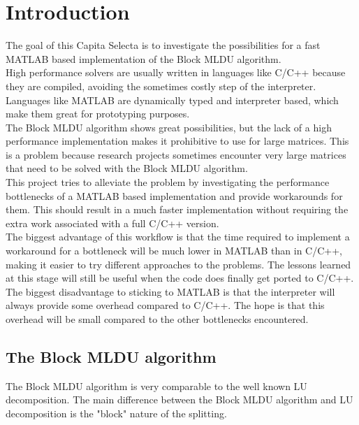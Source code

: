 \chapter{Introduction}

The goal of this Capita Selecta is to investigate the possibilities for a fast MATLAB based implementation of the Block MLDU algorithm.\\

\noindent High performance solvers are usually written in languages like C/C++ because they are compiled, avoiding the sometimes costly step of the interpreter. Languages like MATLAB are dynamically typed and interpreter based, which make them great for prototyping purposes.\\

\noindent The Block MLDU algorithm shows great possibilities, but the lack of a high performance implementation makes it prohibitive to use for large matrices. This is a problem because research projects sometimes encounter very large matrices that need to be solved with the Block MLDU algorithm.\\

\noindent This project tries to alleviate the problem by investigating the performance bottlenecks of a MATLAB based implementation and provide workarounds for them. This should result in a much faster implementation without requiring the extra work associated with a full C/C++ version.\\

\noindent The biggest advantage of this workflow is that the time required to implement a workaround for a bottleneck will be much lower in MATLAB than in C/C++, making it easier to try different approaches to the problems. The lessons learned at this stage will still be useful when the code does finally get ported to C/C++.\\

\noindent The biggest disadvantage to sticking to MATLAB is that the interpreter will always provide some overhead compared to C/C++. The hope is that this overhead will be small compared to the other bottlenecks encountered.

\newpage

\section{The Block MLDU algorithm}

The Block MLDU algorithm is very comparable to the well known LU decomposition. The main difference between the Block MLDU algorithm and LU decomposition is the "block" nature of the splitting.


